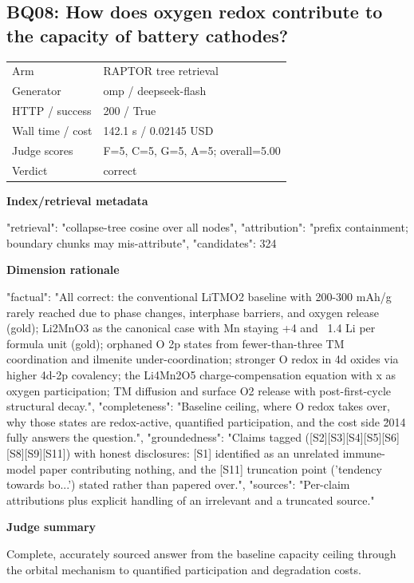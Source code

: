 \documentclass[10pt]{article}
\begin{document}
\subsection{BQ08: How does oxygen redox contribute to the capacity of battery cathodes?}
\begin{tabular}{@{}ll@{}}
Arm & RAPTOR tree retrieval\\
Generator & omp / deepseek-flash\\
HTTP / success & 200 / True\\
Wall time / cost & 142.1 s / 0.02145 USD\\
Judge scores & F=5, C=5, G=5, A=5; overall=5.00\\
Verdict & correct\\
\end{tabular}

\textbf{Index/retrieval metadata}
\begin{EvidenceText}
{
  "retrieval": "collapse-tree cosine over all nodes",
  "attribution": "prefix containment; boundary chunks may mis-attribute",
  "candidates": 324
}
\end{EvidenceText}

\textbf{Dimension rationale}
\begin{EvidenceText}
{
  "factual": "All correct: the conventional LiTMO2 baseline with 200-300 mAh/g rarely reached due to phase changes, interphase barriers, and oxygen release (gold); Li2MnO3 as the canonical case with Mn staying +4 and ~1.4 Li per formula unit (gold); orphaned O 2p states from fewer-than-three TM coordination and ilmenite under-coordination; stronger O redox in 4d oxides via higher 4d-2p covalency; the Li4Mn2O5 charge-compensation equation with x as oxygen participation; TM diffusion and surface O2 release with post-first-cycle structural decay.",
  "completeness": "Baseline ceiling, where O redox takes over, why those states are redox-active, quantified participation, and the cost side \u2014 fully answers the question.",
  "groundedness": "Claims tagged ([S2][S3][S4][S5][S6][S8][S9][S11]) with honest disclosures: [S1] identified as an unrelated immune-model paper contributing nothing, and the [S11] truncation point ('tendency towards bo...') stated rather than papered over.",
  "sources": "Per-claim attributions plus explicit handling of an irrelevant and a truncated source."
}
\end{EvidenceText}

\textbf{Judge summary}
\begin{EvidenceText}
Complete, accurately sourced answer from the baseline capacity ceiling through the orbital mechanism to quantified participation and degradation costs.
\end{EvidenceText}
\end{document}
